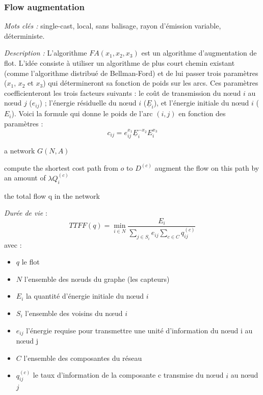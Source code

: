 \subsubsection{Flow augmentation \cite{Chang2000}}
\emph{Mots clés :} single-cast, local, sans balisage, rayon d'émission variable, déterministe.

\emph{Description :}
L'algorithme $FA(x_1, x_2, x_3)$ est un algorithme d'augmentation de flot. L'idée consiste à utiliser un algorithme de plus court chemin existant (comme l'algorithme distribué de Bellman-Ford) et de lui passer trois paramètres ($x_1$, $x_2$ et $x_3$) qui détermineront sa fonction de poids sur les arcs. Ces paramètres coefficienteront les trois facteurs suivants : le coût de transmission du nœud $i$ au nœud $j$ ($e_{ij}$) ; l'énergie résiduelle du nœud $i$ ($\underline{E}_i$), et l'énergie initiale du nœud $i$ ($E_i$). Voici la formule qui donne le poids de l'arc $(i,j)$ en fonction des paramètres :
\begin{displaymath}
c_{ij} = e_{ij}^{x_1} \underline{E}_i^{-x_2} E_i^{x_3}
\end{displaymath}

\begin{algorithm}[H]
\caption{$FA(x_1,x_2,x_3)$}
\label{algo_FA}
\begin{algorithmic}
\REQUIRE a network $ G(N,A) $

			\STATE compute the shortest cost path from $o$ to $D^{(c)}$
			\STATE augment the flow on this path by an amount of $\lambda Q_i^{(c)}$
		\ENDFOR
	\ENDFOR
\ENDWHILE

\RETURN the total flow q in the network
\end{algorithmic}
\end{algorithm}


\emph{Durée de vie} :  $$TTFF(q) = \min\limits_{i \in N}\frac{E_i}{\sum \limits_{j \in S_i} {e_{ij}} \sum \limits_{c \in C} {q_{ij}^{(c)}}}$$
avec :
\begin{itemize}
\item $q$ le flot
\item $N$ l'ensemble des nœuds du graphe (les capteurs)
\item $E_i$ la quantité d'énergie initiale du nœud $i$
\item $S_i$ l'ensemble des voisins du nœud $i$
\item $e_{ij}$ l'énergie requise pour transmettre une unité d'information du nœud i au nœud j
\item $C$ l'ensemble des composantes du réseau
\item $q_{ij}^{(c)}$ le taux d'information de la composante c transmise du nœud $i$ au nœud $j$
\end{itemize}



